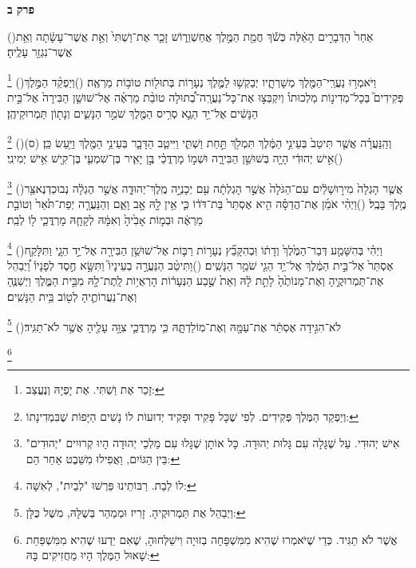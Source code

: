 \documentclass[12pt, openany]{book}
\newcommand{\sethebfont}{
\fontsize{10.5pt}{13.1pt} \selectfont
}
\newcommand{\twocol}[1]{
	{\sethebfont \begin{multicols}{2}
			#1
	\end{multicols}}	
}
\newcommand{\chapname}{}
\newcommand{\newchap}[1]{
	\addcontentsline{toc}{chapter}{#1}
	\renewcommand{\chapname}{#1}
		\begin{center}
			\textbf{%
\fontsize{16pt}{16pt}\selectfont
				#1}
		\end{center}
}
\newcommand{\footnotecomment}[1]{
	\renewcommand\thefootnote{}
	\footnote{#1}}
\newcommand{\commenta}[1]{\footnotecomment{#1}\hspace{0em}}
\newcommand{\vsnum}[1]{(\hebrewnumeral{#1})\space}
\begin{document}
\newchap{פרק ב}
\twocol{\vsnum{1}אַחַר֙ הַדְּבָרִ֣ים הָאֵ֔לֶּה כְּשֹׁ֕ךְ חֲמַ֖ת הַמֶּ֣לֶךְ אֲחַשְׁוֵר֑וֹשׁ זָכַ֤ר אֶת־וַשְׁתִּי֙ וְאֵ֣ת אֲשֶׁר־עָשָׂ֔תָה וְאֵ֥ת אֲשֶׁר־נִגְזַ֖ר עָלֶֽיהָ׃%
\commenta{זָכַר אֶת וַשְׁתִּי. אֶת יָפְיָהּ וְנֶעֱצַב:}%
\vsnum{2}וַיֹּאמְר֥וּ נַעֲרֵֽי־הַמֶּ֖לֶךְ מְשָׁרְתָ֑יו יְבַקְשׁ֥וּ לַמֶּ֛לֶךְ נְעָר֥וֹת בְּתוּל֖וֹת טוֹב֥וֹת מַרְאֶֽה׃
\vsnum{3}וְיַפְקֵ֨ד הַמֶּ֣לֶךְ פְּקִידִים֮ בְּכָל־מְדִינ֣וֹת מַלְכוּתוֹ֒ וְיִקְבְּצ֣וּ אֶת־כָּל־נַעֲרָֽה־בְ֠תוּלָה טוֹבַ֨ת מַרְאֶ֜ה אֶל־שׁוּשַׁ֤ן הַבִּירָה֙ אֶל־בֵּ֣ית הַנָּשִׁ֔ים אֶל־יַ֥ד הֵגֶ֛א סְרִ֥יס הַמֶּ֖לֶךְ שֹׁמֵ֣ר הַנָּשִׁ֑ים וְנָת֖וֹן תַּמְרוּקֵיהֶֽן׃%
\commenta{וְיַפְקֵד הַמֶּלֶךְ פְּקִידִים. לְפִי שֶׁכָּל פָּקִיד וּפָקִיד יְדוּעוֹת לוֹ נָשִׁים הַיָּפוֹת שֶׁבִּמְדִינָתוֹ:}%
\vsnum{4}וְהַֽנַּעֲרָ֗ה אֲשֶׁ֤ר תִּיטַב֙ בְּעֵינֵ֣י הַמֶּ֔לֶךְ תִּמְלֹ֖ךְ תַּ֣חַת וַשְׁתִּ֑י וַיִּיטַ֧ב הַדָּבָ֛ר בְּעֵינֵ֥י הַמֶּ֖לֶךְ וַיַּ֥עַשׂ כֵּֽן׃ (ס)
\vsnum{5}אִ֣ישׁ יְהוּדִ֔י הָיָ֖ה בְּשׁוּשַׁ֣ן הַבִּירָ֑ה וּשְׁמ֣וֹ מָרְדֳּכַ֗י בֶּ֣ן יָאִ֧יר בֶּן־שִׁמְעִ֛י בֶּן־קִ֖ישׁ אִ֥ישׁ יְמִינִֽי׃%
\commenta{אִישׁ יְהוּדִי. עַל שֶׁגָּלָה עִם גָּלוּת יְהוּדָה. כָּל אוֹתָן שֶׁגָּלוּ עִם מַלְכֵי יְהוּדָה הָיוּ קְרוּיִים "יְהוּדִים" בֵּין הַגּוֹיִם, וַאֲפִילוּ מִשֵּׁבֶט אַחֵר הֵם: }%
\vsnum{6}אֲשֶׁ֤ר הָגְלָה֙ מִיר֣וּשָׁלַ֔יִם עִם־הַגֹּלָה֙ אֲשֶׁ֣ר הָגְלְתָ֔ה עִ֖ם יְכָנְיָ֣ה מֶֽלֶךְ־יְהוּדָ֑ה אֲשֶׁ֣ר הֶגְלָ֔ה נְבוּכַדְנֶאצַּ֖ר מֶ֥לֶךְ בָּבֶֽל׃
\vsnum{7}וַיְהִ֨י אֹמֵ֜ן אֶת־הֲדַסָּ֗ה הִ֤יא אֶסְתֵּר֙ בַּת־דֹּד֔וֹ כִּ֛י אֵ֥ין לָ֖הּ אָ֣ב וָאֵ֑ם וְהַנַּעֲרָ֤ה יְפַת־תֹּ֙אַר֙ וְטוֹבַ֣ת מַרְאֶ֔ה וּבְמ֤וֹת אָבִ֙יהָ֙ וְאִמָּ֔הּ לְקָחָ֧הּ מָרְדֳּכַ֛י ל֖וֹ לְבַֽת׃%
\commenta{לוֹ לְבַת. רַבּוֹתֵינוּ פֵּרְשׁוּ "לְבַיִת", לְאִשָּׁה: }%
\vsnum{8}וַיְהִ֗י בְּהִשָּׁמַ֤ע דְּבַר־הַמֶּ֙לֶךְ֙ וְדָת֔וֹ וּֽבְהִקָּבֵ֞ץ נְעָר֥וֹת רַבּ֛וֹת אֶל־שׁוּשַׁ֥ן הַבִּירָ֖ה אֶל־יַ֣ד הֵגָ֑י וַתִּלָּקַ֤ח אֶסְתֵּר֙ אֶל־בֵּ֣ית הַמֶּ֔לֶךְ אֶל־יַ֥ד הֵגַ֖י שֹׁמֵ֥ר הַנָּשִֽׁים׃
\vsnum{9}וַתִּיטַ֨ב הַנַּעֲרָ֣ה בְעֵינָיו֮ וַתִּשָּׂ֣א חֶ֣סֶד לְפָנָיו֒ וַ֠יְבַהֵל אֶת־תַּמְרוּקֶ֤יהָ וְאֶת־מָנוֹתֶ֙הָ֙ לָתֵ֣ת לָ֔הּ וְאֵת֙ שֶׁ֣בַע הַנְּעָר֔וֹת הָרְאֻי֥וֹת לָֽתֶת־לָ֖הּ מִבֵּ֣ית הַמֶּ֑לֶךְ וַיְשַׁנֶּ֧הָ וְאֶת־נַעֲרוֹתֶ֛יהָ לְט֖וֹב בֵּ֥ית הַנָּשִֽׁים׃%
\commenta{וַיְבַהֵל אֶת תַּמְרוּקֶיהָ. זָרִיז וּמְמַהֵר בְּשֶׁלָּהּ, מִשֶּׁל כֻּלָּן: }%
\vsnum{10}לֹא־הִגִּ֣ידָה אֶסְתֵּ֔ר אֶת־עַמָּ֖הּ וְאֶת־מֽוֹלַדְתָּ֑הּ כִּ֧י מָרְדֳּכַ֛י צִוָּ֥ה עָלֶ֖יהָ אֲשֶׁ֥ר לֹא־תַגִּֽיד׃%
\commenta{אֲשֶׁר לֹא תַגִּיד. כְּדֵי שֶׁיֹּאמְרוּ שֶׁהִיא מִמִּשְׁפָּחָה בְזוּיָה וִישַׁלְּחוּהָ, שֶׁאִם יֵדְעוּ שֶׁהִיא מִמִּשְׁפַּחַת שָׁאוּל הַמֶּלֶךְ הָיוּ מַחֲזִיקִים בָּהּ: }%
}
\end{document}
